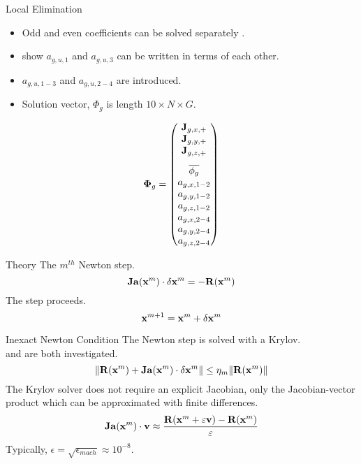 \begin{frame}{Local Elimination}
  \begin{itemize}
    \item Odd and even coefficients can be solved separately \cite{gehinThesis}.
    \item \citeauthor{qe2paper} show $a_{g,u,1}$ and $a_{g,u,3}$ can be written
      in terms of each other.
    \item $a_{g,u,1-3}$ and $a_{g,u,2-4}$ are introduced.
    \item Solution vector, $\Phi_g$ is length $10 \times N \times G$.
  \end{itemize}
  \begin{equation}
    \label{eq:solution_vector}
    \vPhi_g =
    \begin{pmatrix}
      \current_{g,x,+} \\
      \current_{g,y,+} \\
      \vspace{8pt}
      \current_{g,z,+} \\
      \overline{\phi_g} \\
      a_{g,x,1-2} \\
      a_{g,y,1-2} \\
      a_{g,z,1-2} \\
      a_{g,x,2-4} \\
      a_{g,y,2-4} \\
      a_{g,z,2-4}
    \end{pmatrix}
  \end{equation}
\end{frame}

\begin{frame}{ Theory}
  The $m^{th}$ Newton step.
  \begin{equation}
    \label{eq:newton_step}
    \mathbf{Ja} (\mathbf{x}^m) \cdot \delta\mathbf{x}^m = - \mathbf{R}(\mathbf{x}^m)
  \end{equation}
  The step proceeds.
  \begin{equation}
    \mathbf{x}^{m+1} = \mathbf{x}^{m} + \delta\mathbf{x}^{m}
  \end{equation}
\end{frame}

\begin{frame}{Inexact Newton Condition}
  The Newton step is solved with a Krylov. \\
   and  are both investigated.
  \begin{equation}
    \label{eq:inexact_newton_condition}
    \| \mathbf{R}(\mathbf{x}^m) + \mathbf{Ja}(\mathbf{x}^m) \cdot \delta\mathbf{x}^m \| \le 
      \eta_m \| \mathbf{R}(\mathbf{x}^m) \|
  \end{equation}
  The Krylov solver does not require an explicit Jacobian, only the
  Jacobian-vector product which can be approximated with finite differences.
  \begin{equation}
    \label{eq:dirder}
    \mathbf{Ja}(\mathbf{x}^m) \cdot \mathbf{v} \approx \frac{\mathbf{R}(\mathbf{x}^m + \varepsilon \mathbf{v}) - 
      \mathbf{R}(\mathbf{x}^m)}{\varepsilon}
  \end{equation}
  Typically, $\epsilon = \sqrt{\epsilon_{mach}} \approx 10^{-8}$.
\end{frame}

